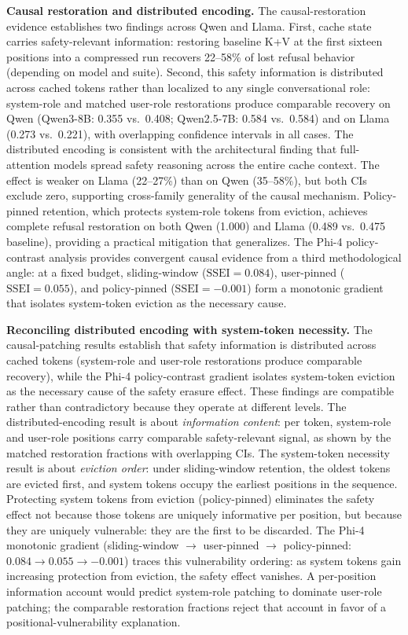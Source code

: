 \documentclass{article}
\newcommand{\ssei}{\mathrm{SSEI}}
\begin{document}
\textbf{Causal restoration and distributed encoding.} The causal-restoration evidence establishes two findings across Qwen and Llama. First, cache state carries safety-relevant information: restoring baseline K+V at the first sixteen positions into a compressed run recovers 22--58\% of lost refusal behavior (depending on model and suite). Second, this safety information is distributed across cached tokens rather than localized to any single conversational role: system-role and matched user-role restorations produce comparable recovery on Qwen (Qwen3-8B: 0.355 vs.\ 0.408; Qwen2.5-7B: 0.584 vs.\ 0.584) and on Llama (0.273 vs.\ 0.221), with overlapping confidence intervals in all cases. The distributed encoding is consistent with the architectural finding that full-attention models spread safety reasoning across the entire cache context. The effect is weaker on Llama (22--27\%) than on Qwen (35--58\%), but both CIs exclude zero, supporting cross-family generality of the causal mechanism. Policy-pinned retention, which protects system-role tokens from eviction, achieves complete refusal restoration on both Qwen (1.000) and Llama (0.489 vs.\ 0.475 baseline), providing a practical mitigation that generalizes. The Phi-4 policy-contrast analysis provides convergent causal evidence from a third methodological angle: at a fixed budget, sliding-window ($\ssei = 0.084$), user-pinned ($\ssei = 0.055$), and policy-pinned ($\ssei = -0.001$) form a monotonic gradient that isolates system-token eviction as the necessary cause.

\textbf{Reconciling distributed encoding with system-token necessity.} The causal-patching results establish that safety information is distributed across cached tokens (system-role and user-role restorations produce comparable recovery), while the Phi-4 policy-contrast gradient isolates system-token eviction as the necessary cause of the safety erasure effect. These findings are compatible rather than contradictory because they operate at different levels. The distributed-encoding result is about \emph{information content}: per token, system-role and user-role positions carry comparable safety-relevant signal, as shown by the matched restoration fractions with overlapping CIs. The system-token necessity result is about \emph{eviction order}: under sliding-window retention, the oldest tokens are evicted first, and system tokens occupy the earliest positions in the sequence. Protecting system tokens from eviction (policy-pinned) eliminates the safety effect not because those tokens are uniquely informative per position, but because they are uniquely vulnerable: they are the first to be discarded. The Phi-4 monotonic gradient (sliding-window $\to$ user-pinned $\to$ policy-pinned: $0.084 \to 0.055 \to -0.001$) traces this vulnerability ordering: as system tokens gain increasing protection from eviction, the safety effect vanishes. A per-position information account would predict system-role patching to dominate user-role patching; the comparable restoration fractions reject that account in favor of a positional-vulnerability explanation.
\end{document}

